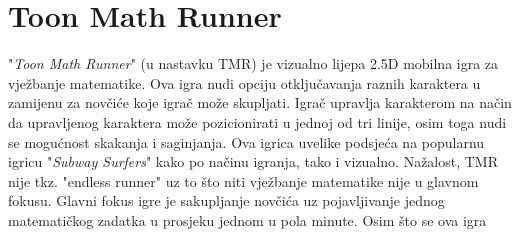 \documentclass[times, utf8, zavrsni]{fer}
\begin{document}
	\section{Toon Math Runner} 
	"\textit{Toon Math Runner}" (u nastavku TMR) je vizualno lijepa 2.5D mobilna igra za vježbanje matematike. Ova igra nudi opciju otključavanja raznih karaktera u zamijenu za novčiće koje igrač može skupljati. Igrač upravlja karakterom
		na način da upravljenog karaktera može pozicionirati u jednoj od tri linije, osim toga nudi se mogućnost skakanja i saginjanja. Ova igrica uvelike podsjeća na popularnu igricu "\textit{Subway Surfers}" kako po načinu igranja, tako i vizualno.
	 Nažalost, TMR nije tkz. "endless runner" uz to što niti vježbanje matematike nije u glavnom fokusu. Glavni fokus igre je sakupljanje novčića uz pojavljivanje jednog matematičkog zadatka u prosjeku jednom u pola minute. Osim što se ova igra 
\end{document}
